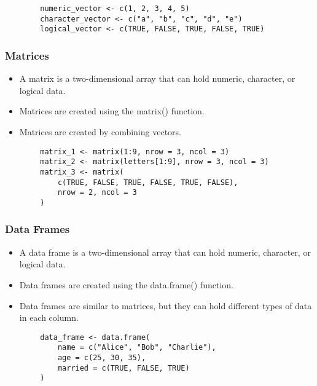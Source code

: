 \documentclass[serif, 9pt, aspectratio=32]{beamer}
\begin{document}
\begin{frame}[fragile]
    \begin{lstlisting}
        numeric_vector <- c(1, 2, 3, 4, 5)
        character_vector <- c("a", "b", "c", "d", "e")
        logical_vector <- c(TRUE, FALSE, TRUE, FALSE, TRUE)
    \end{lstlisting}
\end{frame}

\begin{frame}
    \centering
    \frametitle{Matrices}
    \begin{itemize}
        \setlength{\itemsep}{2em}
        \item A matrix is a two-dimensional array that can hold numeric, character, or logical data.
        \item Matrices are created using the matrix() function.
        \item Matrices are created by combining vectors.
    \end{itemize}
\end{frame}

\begin{frame}[fragile]
    \begin{lstlisting}
        matrix_1 <- matrix(1:9, nrow = 3, ncol = 3)
        matrix_2 <- matrix(letters[1:9], nrow = 3, ncol = 3)
        matrix_3 <- matrix(
            c(TRUE, FALSE, TRUE, FALSE, TRUE, FALSE),
            nrow = 2, ncol = 3
        )
    \end{lstlisting}
\end{frame}

\begin{frame}
    \centering
    \frametitle{Data Frames}
    \begin{itemize}
        \setlength{\itemsep}{2em}
        \item A data frame is a two-dimensional array that can hold numeric, character, or logical data.
        \item Data frames are created using the data.frame() function.
        \item Data frames are similar to matrices, but they can hold different types of data in each column.
    \end{itemize}
\end{frame}

\begin{frame}[fragile]
    \begin{lstlisting}
        data_frame <- data.frame(
            name = c("Alice", "Bob", "Charlie"),
            age = c(25, 30, 35),
            married = c(TRUE, FALSE, TRUE)
        )
    \end{lstlisting}
\end{frame}
\end{document}
